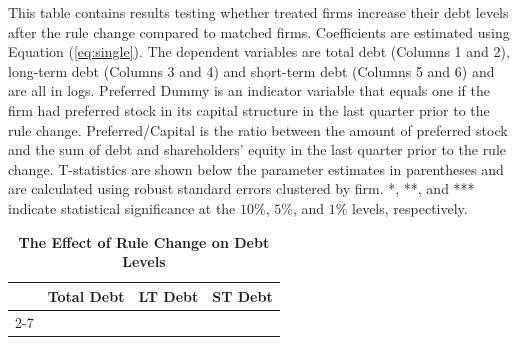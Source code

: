 \documentclass[a4paper, 12pt]{article}
\begin{document}
\clearpage

\newpage

\begin{table}[htbp]
\caption{\textbf{The Effect of Rule Change on Debt Levels}} \label{table_debt}
\begin{singlespace}
\begin{small}

\noindent This table contains results testing whether treated firms increase their debt levels after the rule change compared to matched firms. Coefficients are estimated using Equation (\ref{eq:single}). The dependent variables are total debt (Columns 1 and 2), long-term debt (Columns 3 and 4) and short-term debt (Columns 5 and 6) and are all in logs. Preferred Dummy is an indicator variable that equals one if the firm had preferred stock in its capital structure in the last quarter prior to the rule change. Preferred/Capital is the ratio between the amount of preferred stock and the sum of debt and shareholders' equity in the last quarter prior to the rule change. T-statistics are shown below the parameter estimates in parentheses and are calculated using robust standard errors clustered by firm. *, **, and *** indicate statistical significance at the $10\%$, $5\%$, and $1\%$ levels, respectively.

\end{small}
\end{singlespace}
\vspace{3mm}
\small
  \centering
    \begin{tabular}{lcccccc}
    \toprule
    \textbf{} &
      \multicolumn{2}{c}{\textbf{Total Debt}} &  \multicolumn{2}{c}{\textbf{LT Debt}} &
      \multicolumn{2}{c}{\textbf{ST Debt}}
      \\
      \cline{2-7}



    \bottomrule
    \end{tabular}
\end{table}
\clearpage

\newpage
\end{document}
